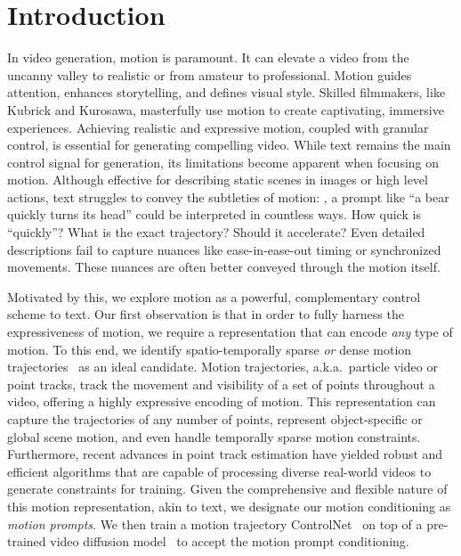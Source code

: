 \section{Introduction}
\label{sec:intro}





In video generation, motion is paramount. It can elevate a video from the uncanny valley to realistic or from amateur to professional. Motion guides attention, enhances storytelling, and defines visual style. Skilled filmmakers, like Kubrick and Kurosawa, masterfully use motion to create captivating, immersive experiences.
Achieving realistic and expressive motion, coupled with granular control, is essential for generating compelling video. While text remains the main control signal for generation, its limitations become apparent when focusing on motion.
Although effective for describing static scenes in images or high level actions, text struggles to convey the subtleties of motion:
\eg, a prompt like ``a bear quickly turns its head'' could be interpreted in countless ways. How quick is ``quickly''? What is the exact trajectory? Should it accelerate? 
Even detailed descriptions fail to capture nuances like ease-in-ease-out timing or synchronized movements.
These nuances are often better conveyed through the motion itself. 



Motivated by this, we explore motion as a powerful, complementary control scheme to text. Our first observation is that in order to fully harness the expressiveness of motion, we require a representation that can encode \emph{any} type of motion.
To this end, we identify spatio-temporally sparse \emph{or} dense motion trajectories~\cite{sand2008particle, harley2022particle} as an ideal candidate. Motion trajectories, a.k.a.~particle video or point tracks, track the movement and visibility of a set of points throughout a video, offering a highly expressive encoding of motion. This representation can capture the trajectories of any number of points, represent object-specific or global scene motion, and even handle temporally sparse motion constraints.
Furthermore, recent advances in point track estimation have yielded robust and efficient algorithms \cite{doersch2023tapir, doersch2024bootstap,karaev23cotracker,karaev2024cotracker3} that are capable of processing diverse real-world videos to generate constraints for training. 
Given the comprehensive and flexible nature of this motion representation, akin to text, we designate our motion conditioning as \emph{motion prompts}. 
We then train a motion trajectory ControlNet~\cite{zhang2023adding} on top of a pre-trained video diffusion model~\cite{bar2024lumiere} to accept the motion prompt conditioning.


